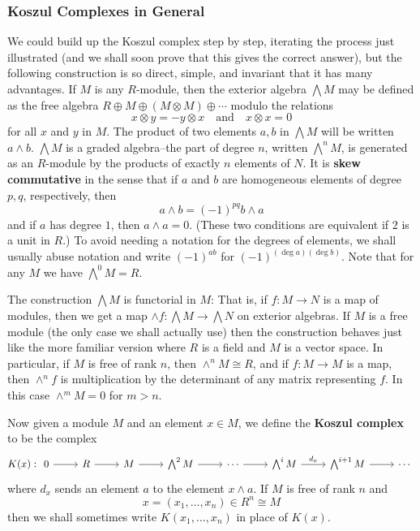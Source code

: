 \subsubsection{Koszul Complexes in General}
We could build up the Koszul complex step by step, iterating the process
just illustrated (and we shall soon prove that this gives the correct answer), but the following construction is so direct, simple, and invariant that it has many advantages.
If $M$ is any $R$-module, then the exterior algebra $\bigwedge M$ may be defined as the free algebra $R\oplus M\oplus(M\otimes M)\oplus\cdots$ modulo the relations 
\[x\otimes y=-y\otimes x\quad\text{and}\quad x\otimes x=0\]
for all $x$ and $y$ in $M$. The product of two elements $a,b$ in $\bigwedge M$ will be written $a\wedge b$. $\bigwedge M$ is a graded algebra--the part of degree $n$, written $\bigwedge^nM$, is generated as an $R$-module by the products of exactly $n$ elements of $N$. It is \textbf{skew commutative} in the sense that if $a$ and $b$ are homogeneous elements of degree $p,q$, respectively, then
\[a\wedge b=(-1)^{pq}b\wedge a\]
and if $a$ has degree $1$, then $a\wedge a=0$. (These two conditions are equivalent if $2$ is a unit in $R$.) To avoid needing a notation for the degrees of elements, we shall usually abuse notation and write $(-1)^{ab}$ for $(-1)^{(\deg a)(\deg b)}$. Note that for any $M$ we have $\bigwedge^0M=R$.\par
The construction $\bigwedge M$ is functorial in $M$: That is, if $f:M\to N$ is a map of modules, then we get a map $\wedge f:\bigwedge M\to\bigwedge N$ on exterior algebras. If $M$ is a free module (the only case we shall actually use) then the construction behaves just like the more familiar version where $R$ is a field and $M$ is a vector space. In particular, if $M$ is free of rank $n$, then $\wedge^nM\cong R$, and if $f:M\to M$ is a map, then $\wedge^nf$ is multiplication by the determinant of any matrix representing $f$. In this case $\wedge^mM=0$ for $m>n$.\par
Now given a module $M$ and an element $x\in M$, we define the \textbf{Koszul complex} to be the complex
\[K(x):\begin{tikzcd}
0\ar[r]&R\ar[r]&M\ar[r]&\bigwedge^2M\ar[r]&\cdots\ar[r]&\bigwedge^iM\ar[r,"d_x"]&\bigwedge^{i+1}M\ar[r]&\cdots
\end{tikzcd}\]
where $d_x$ sends an element $a$ to the element $x\wedge a$. If $M$ is free of rank $n$ and
\[x=(x_1,\dots,x_n)\in R^n\cong M\]
then we shall sometimes write $K(x_1,\dots,x_n)$ in place of $K(x)$.\par
